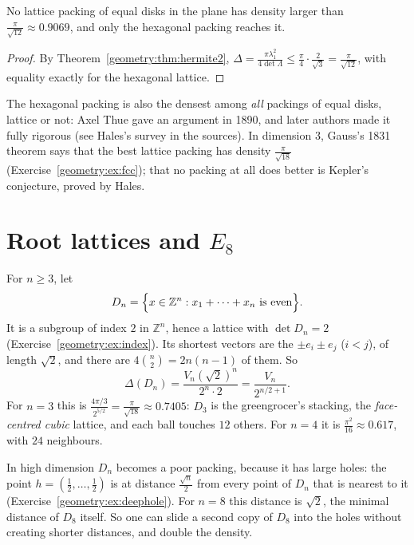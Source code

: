 \begin{corollary}\label{geometry:cor:hexdensity}
No lattice packing of equal disks in the plane has density larger than $\frac\pi{\sqrt{12}}\approx0.9069$, and only the hexagonal packing reaches it.
\end{corollary}

\begin{proof}
By Theorem~\ref{geometry:thm:hermite2}, $\Delta=\frac{\pi\lambda_1^2}{4\det\Lambda}\le\frac\pi4\cdot\frac2{\sqrt3}=\frac\pi{\sqrt{12}}$, with equality exactly for the hexagonal lattice.
\end{proof}

\begin{remark}
The hexagonal packing is also the densest among \emph{all} packings of equal disks, lattice or not: Axel Thue gave an argument in 1890, and later authors made
it fully rigorous (see Hales's survey in the sources). In dimension $3$, Gauss's 1831 theorem says that the best lattice packing has density
$\frac\pi{\sqrt{18}}$ (Exercise~\ref{geometry:ex:fcc}); that no packing at all does better is Kepler's conjecture, proved by Hales.
\end{remark}

\section{Root lattices and \texorpdfstring{$E_8$}{E8}}

For $n\ge3$, let
\[
D_n=\Bigl\{x\in\mathbb Z^n:x_1+\dots+x_n\ \text{is even}\Bigr\}.
\]
It is a subgroup of index $2$ in $\mathbb Z^n$, hence a lattice with $\det D_n=2$ (Exercise~\ref{geometry:ex:index}). Its shortest vectors are the $\pm e_i\pm e_j$ ($i<j$), of
length $\sqrt2$, and there are $4\binom n2=2n(n-1)$ of them. So
\[
\Delta(D_n)=\frac{V_n(\sqrt2)^n}{2^n\cdot2}=\frac{V_n}{2^{n/2+1}}.
\]
For $n=3$ this is $\frac{4\pi/3}{2^{5/2}}=\frac\pi{\sqrt{18}}\approx0.7405$: $D_3$ is the greengrocer's stacking, the \emph{face-centred cubic} lattice, and each
ball touches $12$ others. For $n=4$ it is $\frac{\pi^2}{16}\approx0.617$, with $24$ neighbours.

In high dimension $D_n$ becomes a poor packing, because it has large holes: the point $h=(\frac12,\dots,\frac12)$ is at distance $\frac{\sqrt n}2$ from every
point of $D_n$ that is nearest to it (Exercise~\ref{geometry:ex:deephole}). For $n=8$ this distance is $\sqrt2$, the minimal distance of $D_8$ itself. So one can
slide a second copy of $D_8$ into the holes without creating shorter distances, and double the density.

